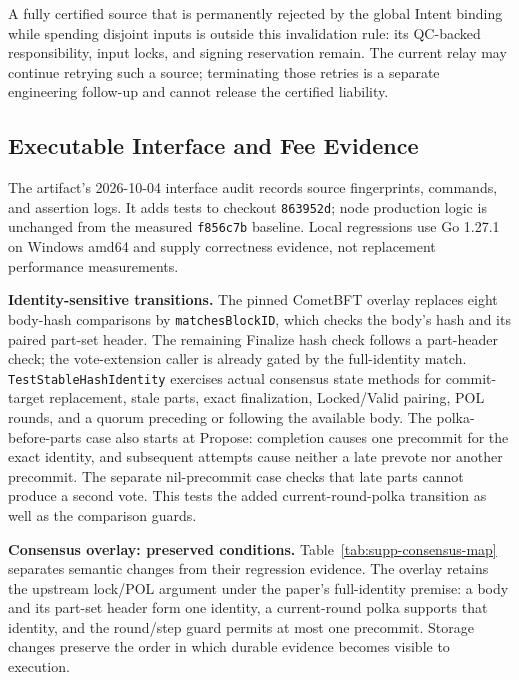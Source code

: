 A fully certified source that is permanently rejected by the global
Intent binding while spending disjoint inputs is outside this
invalidation rule: its QC-backed responsibility, input locks, and
signing reservation remain.  The current relay may continue retrying
such a source; terminating those retries is a separate engineering
follow-up and cannot release the certified liability.

\subsection{Executable Interface and Fee Evidence}
\label{supp:interface-fee-evidence}
The artifact's 2026-10-04 interface audit records source fingerprints,
commands, and assertion logs. It adds tests to checkout \texttt{863952d};
node production logic is unchanged from the measured \texttt{f856c7b}
baseline. Local regressions use Go 1.27.1 on Windows amd64 and supply
correctness evidence, not replacement performance measurements.

\noindent\textbf{Identity-sensitive transitions.}
The pinned CometBFT overlay replaces eight body-hash comparisons by
\texttt{matches\allowbreak BlockID}, which checks the body's hash and its paired part-set
header. The remaining Finalize hash check follows a part-header check;
the vote-extension caller is already gated by the full-identity match.
\texttt{Test\allowbreak Stable\allowbreak Hash\allowbreak Identity} exercises actual consensus state methods for
commit-target replacement, stale parts, exact finalization, Locked/Valid
pairing, POL rounds, and a quorum preceding or following the available body.
The polka-before-parts case also starts at Propose: completion causes one
precommit for the exact identity, and subsequent attempts cause neither a
late prevote nor another precommit. The separate nil-precommit case checks
that late parts cannot produce a second vote. This tests the added
current-round-polka transition as well as the comparison guards.

\noindent\textbf{Consensus overlay: preserved conditions.}
Table~\ref{tab:supp-consensus-map} separates semantic changes from their regression evidence. The overlay retains the upstream lock/POL argument under the paper's full-identity premise: a body and its part-set header form one identity, a current-round polka supports that identity, and the round/step guard permits at most one precommit. Storage changes preserve the order in which durable evidence becomes visible to execution.

